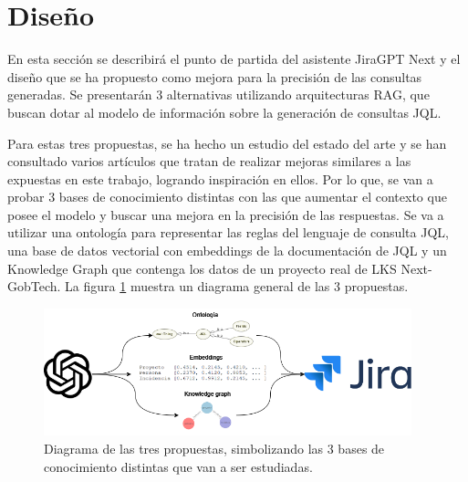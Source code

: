 \section{Diseño}
En esta sección se describirá el punto de partida del asistente JiraGPT Next y el diseño que se ha propuesto como mejora para la precisión de las consultas generadas. Se presentarán 3 alternativas utilizando arquitecturas RAG, que buscan dotar al modelo de información sobre la generación de consultas JQL.

Para estas tres propuestas, se ha hecho un estudio del estado del arte y se han consultado varios artículos que tratan de realizar mejoras similares a las expuestas en este trabajo, logrando inspiración en ellos. Por lo que, se van a probar 3 bases de conocimiento distintas con las que aumentar el contexto que posee el modelo y buscar una mejora en la precisión de las respuestas. Se va a utilizar una ontología para representar las reglas del lenguaje de consulta JQL, una base de datos vectorial con embeddings de la documentación de JQL y un Knowledge Graph que contenga los datos de un proyecto real de LKS Next-GobTech. La figura \ref{fig:diagrama_general} muestra un diagrama general de las 3 propuestas.

\begin{figure}[H]
    \centering
    \includegraphics[width=0.95\textwidth]{images/diagrama_general.png}
    \caption{Diagrama de las tres propuestas, simbolizando las 3 bases de conocimiento distintas que van a ser estudiadas.}\label{fig:diagrama_general}
\end{figure}


